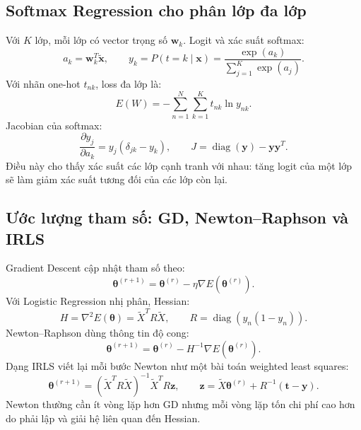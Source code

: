 \documentclass[12pt,a4paper]{article}
\begin{document}
\subsection{Softmax Regression cho phân lớp đa lớp}

Với $K$ lớp, mỗi lớp có vector trọng số $\mathbf{w}_k$. Logit và xác suất softmax:
\begin{equation}
  a_k=\mathbf{w}_k^{T}\tilde{\mathbf{x}},
  \qquad
  y_k=P(t=k\mid \mathbf{x})
  =\frac{\exp(a_k)}{\sum_{j=1}^{K}\exp(a_j)}.
  \label{eq:cls_softmax}
\end{equation}
Với nhãn one-hot $t_{nk}$, loss đa lớp là:
\begin{equation}
  E(W)=-\sum_{n=1}^{N}\sum_{k=1}^{K}t_{nk}\ln y_{nk}.
  \label{eq:cls_softmax_loss}
\end{equation}
Jacobian của softmax:
\begin{equation}
  \frac{\partial y_j}{\partial a_k}=y_j(\delta_{jk}-y_k),
  \qquad
  J=\operatorname{diag}(\mathbf{y})-\mathbf{y}\mathbf{y}^{T}.
  \label{eq:cls_softmax_jacobian}
\end{equation}
Điều này cho thấy xác suất các lớp cạnh tranh với nhau: tăng logit của một lớp
sẽ làm giảm xác suất tương đối của các lớp còn lại.

\subsection{Ước lượng tham số: GD, Newton--Raphson và IRLS}

Gradient Descent cập nhật tham số theo:
\begin{equation}
  \boldsymbol{\theta}^{(r+1)}
  =\boldsymbol{\theta}^{(r)}-\eta\nabla E(\boldsymbol{\theta}^{(r)}).
  \label{eq:cls_gd_update}
\end{equation}
Với Logistic Regression nhị phân, Hessian:
\begin{equation}
  H=\nabla^{2}E(\boldsymbol{\theta})=\tilde{X}^{T}R\tilde{X},
  \qquad
  R=\operatorname{diag}\left(y_n(1-y_n)\right).
  \label{eq:cls_hessian}
\end{equation}
Newton--Raphson dùng thông tin độ cong:
\begin{equation}
  \boldsymbol{\theta}^{(r+1)}
  =\boldsymbol{\theta}^{(r)}-H^{-1}\nabla E(\boldsymbol{\theta}^{(r)}).
  \label{eq:cls_newton}
\end{equation}
Dạng IRLS viết lại mỗi bước Newton như một bài toán weighted least squares:
\begin{equation}
  \boldsymbol{\theta}^{(r+1)}
  =(\tilde{X}^{T}R\tilde{X})^{-1}\tilde{X}^{T}R\mathbf{z},
  \qquad
  \mathbf{z}=\tilde{X}\boldsymbol{\theta}^{(r)}+R^{-1}(\mathbf{t}-\mathbf{y}).
  \label{eq:cls_irls}
\end{equation}
Newton thường cần ít vòng lặp hơn GD nhưng mỗi vòng lặp tốn chi phí cao hơn do
phải lập và giải hệ liên quan đến Hessian.
\end{document}
